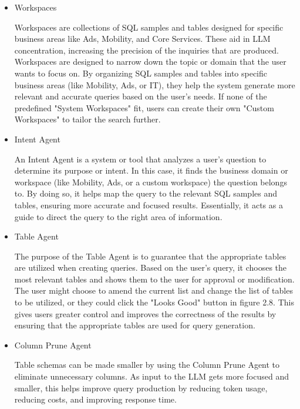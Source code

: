         \begin{itemize}
            \item  Workspaces
            
            Workspaces are collections of SQL samples and tables designed for specific business areas like Ads, Mobility, and Core Services. These aid in LLM concentration, increasing the precision of the inquiries that are produced. Workspaces are designed to narrow down the topic or domain that the user wants to focus on. By organizing SQL samples and tables into specific business areas (like Mobility, Ads, or IT), they help the system generate more relevant and accurate queries based on the user's needs. If none of the predefined "System Workspaces" fit, users can create their own "Custom Workspaces" to tailor the search further.
            \item  Intent Agent
            
            An Intent Agent is a system or tool that analyzes a user's question to determine its purpose or intent. In this case, it finds the business domain or workspace (like Mobility, Ads, or a custom workspace) the question belongs to. By doing so, it helps map the query to the relevant SQL samples and tables, ensuring more accurate and focused results. Essentially, it acts as a guide to direct the query to the right area of information.
            \item  Table Agent
            
            The purpose of the Table Agent is to guarantee that the appropriate tables are utilized when creating queries. Based on the user's query, it chooses the most relevant tables and shows them to the user for approval or modification. The user might choose to amend the current list and change the list of tables to be utilized, or they could click the "Looks Good" button in figure 2.8. This gives users greater control and improves the correctness of the results by ensuring that the appropriate tables are used for query generation.
            \item Column Prune Agent
            
            Table schemas can be made smaller by using the Column Prune Agent to eliminate unnecessary columns. As input to the LLM gets more focused and smaller, this helps improve query production by reducing token usage, reducing costs, and improving response time.
        \end{itemize}
